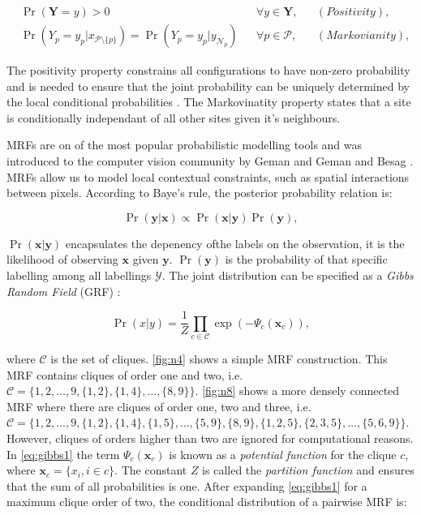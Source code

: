 \begin{align}
	&\Pr(\mathbf{Y}=y) > 0&  &\forall y \in \mathbf{Y},& &(Positivity),&\\
	&\Pr(Y_p=y_p | x_{\mathcal{P}\setminus \{p\}}) = \Pr(Y_p=y_p | y_{\mathcal{N}_p})&  &\forall p \in \mathcal{P},& &(Markovianity),&
\end{align}

The positivity property constrains all configurations to have non-zero probability and is needed to ensure that the joint probability can be uniquely determined by the local conditional probabilities \citep{Smith1997}.
The Markovinatity property states that a site is conditionally independant of all other sites given it's neighbours.

MRFs are on of the most popular probabilistic modelling tools and was introduced to the computer vision community by Geman and Geman \citep{Geman1984} and Besag \citep{Besag1986}.
MRFs allow us to model local contextual constraints, such as spatial interactions between pixels.
According to Baye's rule, the posterior probability relation is:

\begin{equation}
	\Pr(\mathbf{y}|\mathbf{x}) \propto \Pr(\mathbf{x}|\mathbf{y})\Pr(\mathbf{y}),
\end{equation}

$\Pr(\mathbf{x}|\mathbf{y})$ encapsulates the depenency ofthe labels on the observation, it is the likelihood of observing $\mathbf{x}$ given $\mathbf{y}$.
$\Pr(\mathbf{y})$ is the probability of that specific labelling among all labellings $\mathcal{Y}$.
The joint distribution can be specified as a \textit{Gibbs Random Field} (GRF) \citep{Lafferty2001,HammersleyClifford1971}:

\begin{equation}
	\Pr(x|y) = \frac{1}{Z}\prod_{c \in \mathcal{C}}\exp(-\Psi_c(\mathbf{x}_c)),
	\label{eq:gibbs1}
\end{equation}

where $\mathcal{C}$ is the set of cliques.
\autoref{fig:n4} shows a simple MRF construction.
This MRF contains cliques of order one and two, i.e. $\mathcal{C} = \{1, 2, \ldots, 9, \{1,2\}, \{1,4\}, \ldots, \{8,9\}\}$. \autoref{fig:n8} shows a more densely connected MRF where there are cliques of order one, two and three, i.e. $\mathcal{C} = \{1, 2, \ldots, 9, \{1,2\}, \{1,4\}, \{1,5\}, \ldots, \{5,9\}, \{8,9\}, \{1,2,5\}, \{2,3,5\}, \ldots, \{5,6,9\} \}$.
However, cliques of orders higher than two are ignored for computational reasons.
In \autoref{eq:gibbs1} the term $\Psi_c(\mathbf{x}_c)$ is known as a \textit{potential function} for the clique $c$, where $\mathbf{x}_c = \{x_i, i \in c\}$.
The constant $Z$ is called the \textit{partition function} and ensures that the sum of all probabilities is one.
After expanding \autoref{eq:gibbs1} for a maximum clique order of two, the conditional distribution of a pairwise MRF is:

